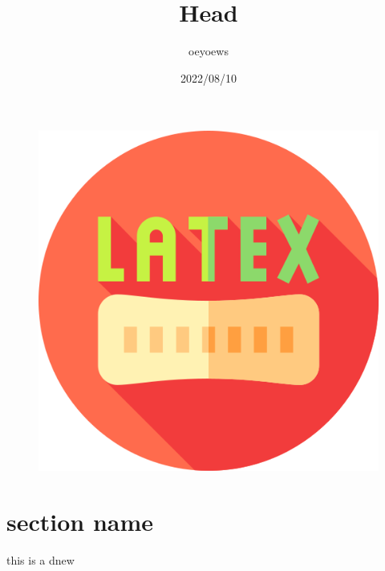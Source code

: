 \documentclass{article}
\title{Head}
\author{oeyoews}
\date{2022/08/10}
\begin{document}
\maketitle

\thispagestyle{empty}
\setcounter{page}{1}

\begin{figure}[b]
	\centering
	\includegraphics[scale=0.4]{latex}
\end{figure}

\section{section name}%
\label{sec:section name}
this is a dnew 
\end{document}
